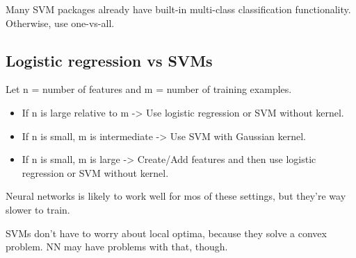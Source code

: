 Many SVM packages already have built-in multi-class classification
functionality. Otherwise, use one-vs-all.

\subsection{Logistic regression vs
SVMs}\label{logistic-regression-vs-svms}

Let n = number of features and m = number of training examples.
\smallskip

\begin{itemize}
\itemsep1pt\parskip0pt
\item
  If n is large relative to m -\textgreater{} Use logistic regression or
  SVM without kernel.
\item
  If n is small, m is intermediate -\textgreater{} Use SVM with Gaussian
  kernel.
\item
  If n is small, m is large -\textgreater{} Create/Add features and then
  use logistic regression or SVM without kernel.
\end{itemize}

Neural networks is likely to work well for mos of these settings, but
they're way slower to train.

SVMs don't have to worry about local optima, because they solve a convex
problem. NN may have problems with that, though.
